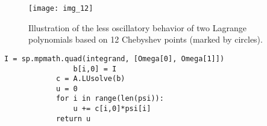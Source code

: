 \documentclass[../main.tex]{subfiles}
\begin{document}
	\begin{figure}[H]
		\centering
		\texttt{[image: img\_12]}
		\caption{Illustration of the less oscillatory behavior of two Lagrange polynomials based on 12 Chebyshev points (marked by circles).}
		\label{fig:img_12}
	\end{figure}
	\begin{lstlisting}[numbers=none]
					I = sp.mpmath.quad(integrand, [Omega[0], Omega[1]])
				b[i,0] = I
			c = A.LUsolve(b)
			u = 0
			for i in range(len(psi)):
				u += c[i,0]*psi[i]
			return u
	\end{lstlisting}
	
\end{document}
